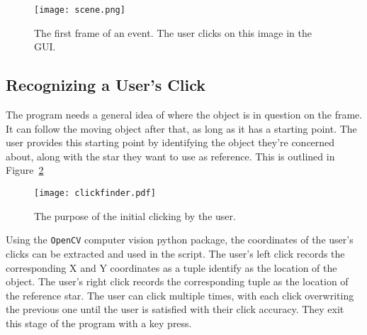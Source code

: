 \begin{figure}[ht!]
	\centering
	\texttt{[image: scene.png]}
	\caption{The first frame of an event. The user clicks on this image in the GUI.}
	\label{fig:scene}
\end{figure}

\subsection{Recognizing a User's Click}

The program needs a general idea of where the object is in question on the frame. It can follow the moving object after that, as long as it has a starting point. The user provides this starting point by identifying the object they're concerned about, along with the star they want to use as reference. This is outlined in Figure~\ref{fig:clickfinder}

\begin{figure}[h!]
	\centering
	\texttt{[image: clickfinder.pdf]}
	\caption{The purpose of the initial clicking by the user.}
	\label{fig:clickfinder}
\end{figure}

Using the \texttt{OpenCV} computer vision python package, the coordinates of the user's clicks can be extracted and used in the script. The user's left click records the corresponding X and Y coordinates as a tuple identify as the location of the object. The user's right click records the corresponding tuple as the location of the reference star. The user can click multiple times, with each click overwriting the previous one until the user is satisfied with their click accuracy. They exit this stage of the program with a key press.


